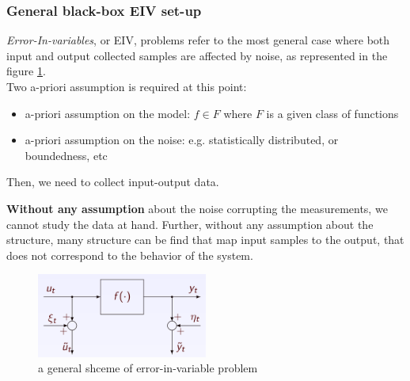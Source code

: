 \begin{center}\end{center}
\newpage

\subsubsection{General black-box EIV set-up}

\textit{Error-In-variables}, or EIV, problems refer to the most general case where both input and output collected samples are affected by noise, as represented in the figure \ref{fig:EIV}.\\
Two a-priori assumption is required at this point:\\
\begin{itemize}
\item a-priori assumption on the model: \(f \in F\) where \(F\) is a given class of functions
\item a-priori assumption on the noise: e.g. statistically distributed, or boundedness, etc
\end{itemize}
Then, we need to collect input-output data.
\begin{factbox}
\textbf{Without any assumption} about the noise corrupting the measurements, we cannot study the data at hand. Further, without any assumption about the structure, many structure can be find that map input samples to the output, that does not correspond to the behavior of the system. 
\end{factbox}

\begin{figure}[htbp]
    \centering
    \includegraphics[width=0.5\textwidth]{images/EIV-problem.png}
    \caption{a general shceme of error-in-variable problem}
    \label{fig:EIV}
\end{figure}

